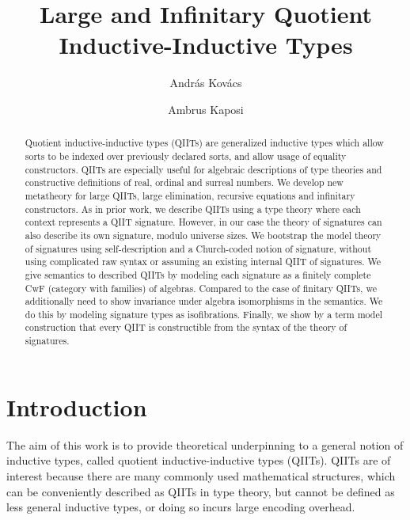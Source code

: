 \documentclass{article}
\title{Large and Infinitary Quotient Inductive-Inductive Types}
\author{Andr{\'a}s Kov{\'a}cs}
\author{Ambrus Kaposi}
\affil{E\"otv\"os Lor\'and University}
\theoremstyle{definition}
\theoremstyle{theorem}
\begin{document}
\maketitle

\begin{abstract}
Quotient inductive-inductive types (QIITs) are generalized inductive types which
allow sorts to be indexed over previously declared sorts, and allow usage of
equality constructors. QIITs are especially useful for algebraic descriptions of
type theories and constructive definitions of real, ordinal and surreal
numbers. We develop new metatheory for large QIITs, large elimination, recursive
equations and infinitary constructors. As in prior work, we describe QIITs using
a type theory where each context represents a QIIT signature. However, in our
case the theory of signatures can also describe its own signature, modulo
universe sizes. We bootstrap the model theory of signatures using
self-description and a Church-coded notion of signature, without using
complicated raw syntax or assuming an existing internal QIIT of signatures. We
give semantics to described QIITs by modeling each signature as a finitely
complete CwF (category with families) of algebras. Compared to the case of
finitary QIITs, we additionally need to show invariance under algebra
isomorphisms in the semantics. We do this by modeling signature types as
isofibrations. Finally, we show by a term model construction that every QIIT is
constructible from the syntax of the theory of signatures.
\end{abstract}

\section{Introduction}

The aim of this work is to provide theoretical underpinning to a general notion
of inductive types, called quotient inductive-inductive types (QIITs). QIITs are
of interest because there are many commonly used mathematical structures, which
can be conveniently described as QIITs in type theory, but cannot be defined as
less general inductive types, or doing so incurs large encoding overhead.
\end{document}
